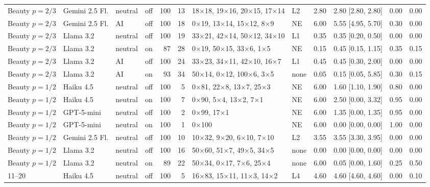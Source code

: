 \documentclass[11pt]{article}
\begin{document}
\begin{longtable}{@{}llllrrp{2.3cm}lrlrr@{}}
Beauty $p{=}2/3$ & Gemini 2.5 Fl. & neutral & off & 100 & 13 & 18$\times$18, 19$\times$16, 20$\times$15, 17$\times$14 & L2 & 2.80 & 2.80 [2.80, 2.80] & 0.00 & 0.00 \\
Beauty $p{=}2/3$ & Gemini 2.5 Fl. & AI & off & 100 & 18 & 0$\times$19, 13$\times$14, 15$\times$12, 8$\times$9 & NE & 6.00 & 5.55 [4.95, 5.70] & 0.30 & 0.00 \\
Beauty $p{=}2/3$ & Llama 3.2 & neutral & off & 100 & 19 & 33$\times$21, 42$\times$14, 50$\times$12, 34$\times$10 & L1 & 0.35 & 0.35 [0.20, 0.50] & 0.00 & 0.00 \\
Beauty $p{=}2/3$ & Llama 3.2 & neutral & on & 87 & 28 & 0$\times$19, 50$\times$15, 33$\times$6, 1$\times$5 & NE & 0.15 & 0.45 [0.15, 1.15] & 0.35 & 0.15 \\
Beauty $p{=}2/3$ & Llama 3.2 & AI & off & 100 & 24 & 33$\times$23, 34$\times$11, 42$\times$10, 16$\times$7 & L1 & 0.45 & 0.45 [0.30, 2.00] & 0.00 & 0.00 \\
Beauty $p{=}2/3$ & Llama 3.2 & AI & on & 93 & 34 & 50$\times$14, 0$\times$12, 100$\times$6, 3$\times$5 & none & 0.05 & 0.15 [0.05, 5.85] & 0.30 & 0.15 \\
Beauty $p{=}1/2$ & Haiku 4.5 & neutral & off & 100 & 5 & 0$\times$81, 22$\times$8, 13$\times$7, 25$\times$3 & NE & 6.00 & 1.60 [1.10, 1.90] & 0.80 & 0.00 \\
Beauty $p{=}1/2$ & Haiku 4.5 & neutral & on & 100 & 7 & 0$\times$90, 5$\times$4, 13$\times$2, 7$\times$1 & NE & 6.00 & 2.50 [0.00, 3.32] & 0.95 & 0.00 \\
Beauty $p{=}1/2$ & GPT-5-mini & neutral & off & 100 & 2 & 0$\times$99, 17$\times$1 & NE & 6.00 & 1.35 [0.00, 1.35] & 0.95 & 0.00 \\
Beauty $p{=}1/2$ & GPT-5-mini & neutral & on & 100 & 1 & 0$\times$100 & NE & 6.00 & 0.00 [0.00, 0.00] & 1.00 & 0.00 \\
Beauty $p{=}1/2$ & Gemini 2.5 Fl. & neutral & off & 100 & 10 & 10$\times$32, 9$\times$20, 6$\times$10, 7$\times$10 & L2 & 3.55 & 3.55 [3.30, 3.95] & 0.00 & 0.00 \\
Beauty $p{=}1/2$ & Llama 3.2 & neutral & off & 100 & 16 & 50$\times$60, 51$\times$7, 49$\times$5, 34$\times$5 & none & 0.00 & 0.00 [0.00, 0.00] & 0.00 & 0.00 \\
Beauty $p{=}1/2$ & Llama 3.2 & neutral & on & 89 & 22 & 50$\times$34, 0$\times$17, 7$\times$6, 25$\times$4 & none & 6.00 & 0.05 [0.00, 1.60] & 0.25 & 0.50 \\
11--20 & Haiku 4.5 & neutral & off & 100 & 5 & 16$\times$83, 15$\times$11, 11$\times$3, 14$\times$2 & L4 & 4.60 & 4.60 [4.60, 4.60] & 0.00 & 0.10 \\

\end{longtable}
\end{document}
